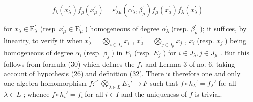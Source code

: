 \[
f _ {\lambda} ^ {\prime} (x _ {\lambda} ^ {\prime}) f _ {\mu} ^ {\prime} (x _ {\mu} ^ {\prime}) = \varepsilon_ {\lambda \mu} ^ {\prime} (\alpha_ {\lambda} ^ {\prime}, \beta_ {\mu} ^ {\prime}) f _ {\mu} ^ {\prime} (x _ {\mu} ^ {\prime}) f _ {\lambda} ^ {\prime} (x _ {\lambda} ^ {\prime})\tag{34}
\]

for \(x_{\lambda}^{\prime} \in \mathrm{E}_{\lambda}^{\prime}\) (resp. \(x_{\mu}^{\prime} \in \mathrm{E}_{\mu}^{\prime}\) ) homogeneous of degree \(\alpha_{\lambda}^{\prime}\) (resp. \(\beta_{\mu}^{\prime}\) ); it suffices, by linearity, to verify it when \(x_{\lambda}^{\prime} = \bigotimes_{i \in J_{\lambda}} x_{i}\) , \(x_{\mu}^{\prime} = \bigotimes_{j \in J_{\mu}} x_{j}\) , \(x_{i}\) (resp. \(x_{j}\) ) being homogeneous of degree \(\alpha_{i}\) (resp. \(\beta_{j}\) ) in \(E_{i}\) (resp. \(E_{j}\) ) for \(i \in J_{\lambda}, j \in J_{\mu}\) . But this follows from formula (30) which defines the \(f_{\lambda}^{\prime}\) and Lemma 3 of no. 6, taking account of hypothesis (26) and definition (32). There is therefore one and only one algebra homomorphism \(f: ^{\varepsilon'} \bigotimes_{\lambda \in L} E_{\lambda}' \to F\) such that \(f \circ h_{\lambda}' = f_{\lambda}'\) for all \(\lambda \in L\) ; whence \(f \circ h_{i}' = f_{i}\) for all \(i \in I\) and the uniqueness of \(f\) is trivial.

